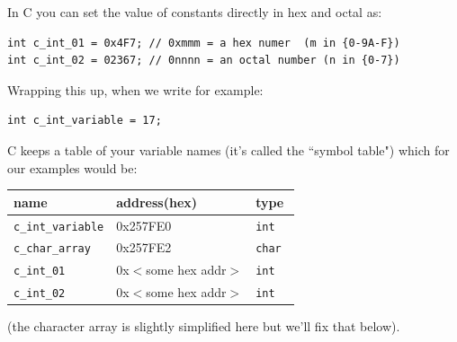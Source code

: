 %

In C you can set the value of constants directly in hex and octal as:	%


\begin{verbatim}
int c_int_01 = 0x4F7; // 0xmmm = a hex numer  (m in {0-9A-F})
int c_int_02 = 02367; // 0nnnn = an octal number (n in {0-7})
\end{verbatim}

%
%
%
%

Wrapping this up, when we write for example:

\begin{verbatim}
int c_int_variable = 17;
\end{verbatim}

C keeps a table of your variable names (it's called the ``symbol table") which 
for our examples would be:

\begin{tabular}{l|l|l}\\
name & address(hex) & type \\ \hline
{\tt c\_int\_variable} & 0x257FE0 & {\tt int} \\
{\tt c\_char\_array}   & 0x257FE2   & {\tt char } \\
{\tt c\_int\_01} & 0x$<$some hex addr$>$ & {\tt int} \\
{\tt c\_int\_02} & 0x$<$some hex addr$>$ & {\tt int} \\
\end{tabular}


(the character array is slightly simplified here but we'll fix that below).




